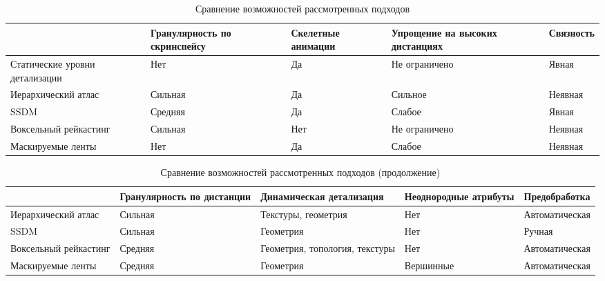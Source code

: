 \documentclass[12pt]{extarticle}
\begin{document}
\begin{table}[ht]
\small
\centering
\begin{tabular}{ p{24mm} | p{26mm} | p{18mm} | p{20mm} | p{16mm} }
                       & Гранулярность по скринспейсу & Скелетные анимации & Упрощение на высоких дистанциях & Связность \\
\hline
Статические уровни детализации & Нет                          & Да                 & Не ограничено            & Явная     \\
\hline
Иерархический атлас    & Сильная                      & Да                 & Сильное                  & Неявная   \\
\hline
SSDM                   & Средняя                      & Да                 & Слабое                   & Явная     \\
\hline
Воксельный рейкастинг  & Сильная                      & Нет                & Не ограничено            & Неявная   \\
\hline
Маскируемые ленты      & Нет                          & Да                 & Слабое                   & Неявная   \\
\end{tabular}
\caption{Сравнение возможностей рассмотренных подходов}
\end{table}

\begin{table}[ht]
\small
\centering
\begin{tabular}{ p{24mm} | p{24mm} | p{24mm} | p{24mm} | p{24mm} }
                      & Гранулярность по дистанции & Динамическая детализация
                      & Неоднородные атрибуты & Предобработка \\
\hline
Иерархический атлас   & Сильная & Текстуры, геометрия            & Нет & Автоматическая \\
\hline
SSDM                  & Сильная & Геометрия                      & Нет & Ручная \\
\hline
Воксельный рейкастинг & Средняя & Геометрия, топология, текстуры & Нет & Автоматическая \\
\hline
Маскируемые ленты     & Средняя & Геометрия                      & Вершинные & Автоматическая \\
\end{tabular}
\caption{Сравнение возможностей рассмотренных подходов (продолжение)}
\end{table}
\end{document}
